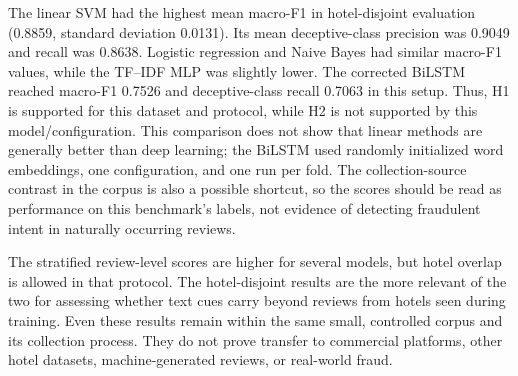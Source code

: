 \documentclass[12pt,a4paper]{report}
\begin{document}
\begin{table}[htbp]
\centering
\caption{Hotel-disjoint five-fold results (mean $\pm$ standard deviation)}
\label{tab:hotel-results}
\scriptsize
{}
\end{table}

The linear SVM had the highest mean macro-F1 in hotel-disjoint evaluation (0.8859, standard deviation 0.0131). Its mean deceptive-class precision was 0.9049 and recall was 0.8638. Logistic regression and Naive Bayes had similar macro-F1 values, while the TF--IDF MLP was slightly lower. The corrected BiLSTM reached macro-F1 0.7526 and deceptive-class recall 0.7063 in this setup. Thus, H1 is supported for this dataset and protocol, while H2 is not supported by this model/configuration. This comparison does not show that linear methods are generally better than deep learning; the BiLSTM used randomly initialized word embeddings, one configuration, and one run per fold. The collection-source contrast in the corpus is also a possible shortcut, so the scores should be read as performance on this benchmark's labels, not evidence of detecting fraudulent intent in naturally occurring reviews.

The stratified review-level scores are higher for several models, but hotel overlap is allowed in that protocol. The hotel-disjoint results are the more relevant of the two for assessing whether text cues carry beyond reviews from hotels seen during training. Even these results remain within the same small, controlled corpus and its collection process. They do not prove transfer to commercial platforms, other hotel datasets, machine-generated reviews, or real-world fraud.
\end{document}
